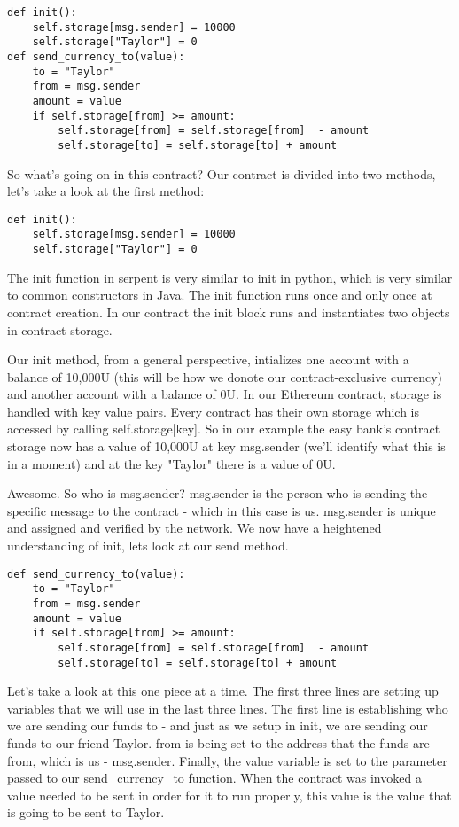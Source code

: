 \documentclass[12pt]{article}
\begin{document}
\begin{lstlisting}[frame=single]
def init():
	self.storage[msg.sender] = 10000
	self.storage["Taylor"] = 0
def send_currency_to(value):
	to = "Taylor"
	from = msg.sender
	amount = value
	if self.storage[from] >= amount:
		self.storage[from] = self.storage[from]  - amount
		self.storage[to] = self.storage[to] + amount
\end{lstlisting}
		
		
So what's going on in this contract?
Our contract is divided into two methods, let's take a look at the first method:

\begin{lstlisting}
def init():
	self.storage[msg.sender] = 10000
	self.storage["Taylor"] = 0
\end{lstlisting}
	
The init function in serpent is very similar to init in python, which is very similar to common constructors in Java. The init function runs once and only once at contract creation. In our contract the init block runs and instantiates two objects in contract storage.
 
Our init method, from a general perspective, intializes one account with a balance of 10,000U (this will be how we donote our contract-exclusive currency) and another account with a balance of 0U. In our Ethereum contract, storage is handled with key value pairs. Every contract has their own storage which is accessed by calling self.storage[key]. So in our example the easy bank's contract storage now has a value of 10,000U at key msg.sender (we'll identify what this is in a moment) and at the key "Taylor" there is a value of 0U. 

 Awesome. So who is msg.sender? msg.sender is the person who is sending the specific message to the contract - which in this case is us. msg.sender is unique and assigned and verified by the network. We now have a heightened understanding of init, lets look at our send method.



\begin{lstlisting}[frame=single]
def send_currency_to(value):
	to = "Taylor"
	from = msg.sender
	amount = value
	if self.storage[from] >= amount:
		self.storage[from] = self.storage[from]  - amount
		self.storage[to] = self.storage[to] + amount
\end{lstlisting}

Let's take a look at this one piece at a time. The first three lines are setting up variables that we will use in the last three lines. The first line is establishing who we are sending our funds to - and just as we setup in init, we are sending our funds to our friend Taylor. 
from is being set to the address that the funds are from, which is us - msg.sender. Finally, the value variable is set to the parameter passed to our send\_currency\_to function. When the contract was invoked a value needed to be sent in order for it to run properly, this value is the value that is going to be sent to Taylor.
\end{document}
